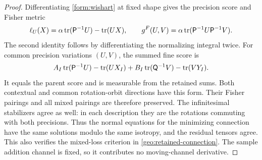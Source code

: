 \begin{proof}
Differentiating \cref{form:wishart} at fixed shape gives the precision score
and Fisher metric
\begin{equation}
 \ell_U(X)=\alpha\operatorname{tr}(\mathsf P^{-1}U)-\operatorname{tr}(UX),\qquad
 g^F(U,V)=\alpha\operatorname{tr}(\mathsf P^{-1}U\mathsf P^{-1}V).
 \label{form:fisher}
\end{equation}
The second identity follows by differentiating the normalizing integral
twice. For common precision variations $(U,V)$, the summed fine score is
\begin{equation}
 A_I\operatorname{tr}(\mathsf P^{-1}U)-\operatorname{tr}(UX_I)
 +B_I\operatorname{tr}(\mathsf Q^{-1}V)-\operatorname{tr}(VY_I).
\end{equation}
It equals the parent score and is measurable from the retained sums.
Both contextual and common rotation-orbit directions have this form.
Their Fisher pairings and all mixed pairings are therefore preserved.
The infinitesimal stabilizers agree as well: in each description they are
the rotations commuting with both precisions. Thus the normal equations
for the minimizing connection have the same solutions modulo the same
isotropy, and the residual tensors agree. This also verifies the mixed-loss
criterion in \cref{geo:retained-connection}. The sample addition channel is
fixed, so it contributes no moving-channel derivative.


\end{proof}
